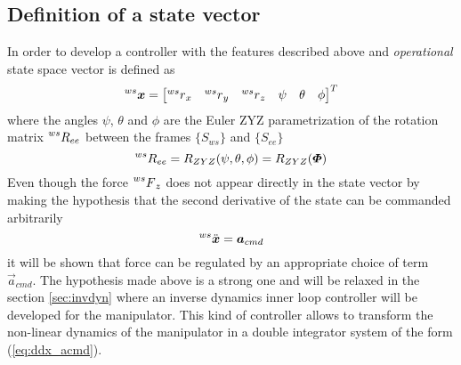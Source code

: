 \subsection{Definition of a state vector}
In order to develop a controller with the features described above
and \emph{operational}  state space vector is defined as
\begin{equation}
  \label{eq:state_space}
  \prescript{ws}{}{\vec{x}} = 
  \begin{bmatrix}
    \prescript{ws}{} r_x & \prescript{ws}{} r_y & \prescript{ws}{}r_z & \psi & \theta & \phi
  \end{bmatrix}^T
\end{equation}
where the angles $\psi$, $\theta$ and $\phi$ are the Euler ZYZ parametrization of the rotation matrix
$\prescript{ws}{}{R}_{ee}$ between the frames $\{S_{ws}\}$ and $\{S_{ee}\}$
\[
\prescript{ws}{}{R}_{ee} = R_{ZYZ}(\psi, \theta, \phi) = R_{ZYZ}(\vec{\Phi})
\]
Even though the force $\prescript{ws}{} F_z$ does not appear directly in the state vector
by making the hypothesis that the second derivative of the state can be commanded arbitrarily
\begin{equation}\label{eq:ddx_acmd}
\prescript{ws}{}{\ddot{\vec{x}}} = \vec{a}_{cmd}
\end{equation}
it will be shown that force can be regulated by an appropriate choice of term $\vec{a}_{cmd}$.
The hypothesis made above is a strong one and will be relaxed in the section \ref{sec:invdyn}
where an inverse dynamics inner loop controller will be developed for the manipulator.
This kind of controller allows to transform the non-linear dynamics of the manipulator in a
double integrator system of the form (\ref{eq:ddx_acmd}).

